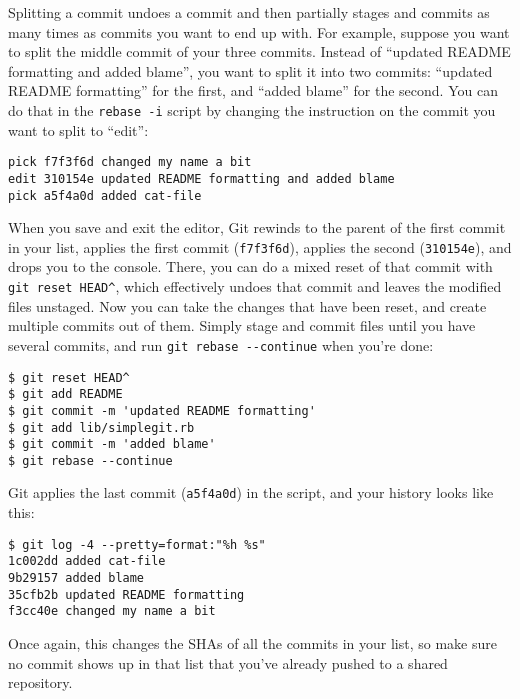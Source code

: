 \documentclass[a4paper]{book}
\begin{document}
Splitting a commit undoes a commit and then partially stages and commits as many times as commits you want to end up with. For example, suppose you want to split the middle commit of your three commits. Instead of “updated README formatting and added blame”, you want to split it into two commits: “updated README formatting” for the first, and “added blame” for the second. You can do that in the \texttt{rebase -i} script by changing the instruction on the commit you want to split to “edit”:

\begin{shaded}\begin{verbatim}
pick f7f3f6d changed my name a bit
edit 310154e updated README formatting and added blame
pick a5f4a0d added cat-file
\end{verbatim}\end{shaded}

When you save and exit the editor, Git rewinds to the parent of the first commit in your list, applies the first commit (\texttt{f7f3f6d}), applies the second (\texttt{310154e}), and drops you to the console. There, you can do a mixed reset of that commit with \texttt{git reset HEAD\^{}}, which effectively undoes that commit and leaves the modified files unstaged. Now you can take the changes that have been reset, and create multiple commits out of them. Simply stage and commit files until you have several commits, and run \texttt{git rebase -{}-continue} when you're done:

\begin{shaded}\begin{verbatim}
$ git reset HEAD^
$ git add README
$ git commit -m 'updated README formatting'
$ git add lib/simplegit.rb
$ git commit -m 'added blame'
$ git rebase --continue
\end{verbatim}\end{shaded}

Git applies the last commit (\texttt{a5f4a0d}) in the script, and your history looks like this:

\begin{shaded}\begin{verbatim}
$ git log -4 --pretty=format:"%h %s"
1c002dd added cat-file
9b29157 added blame
35cfb2b updated README formatting
f3cc40e changed my name a bit
\end{verbatim}\end{shaded}

Once again, this changes the SHAs of all the commits in your list, so make sure no commit shows up in that list that you've already pushed to a shared repository.
\end{document}
